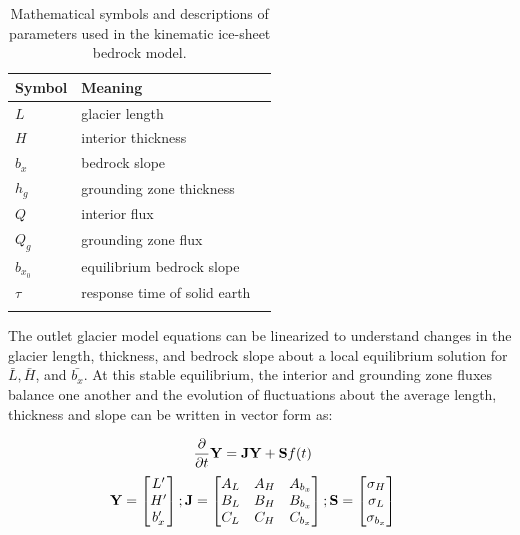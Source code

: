 \documentclass[tc, manuscript]{copernicus}
\begin{document}
\begin{table}[h]
    \begin{tabular}{lll}
        Symbol & Meaning \\
        \hline
        $L$ & glacier length \\
        $H$ & interior thickness \\
        $b_x$ & bedrock slope \\
        $h_g$ & grounding zone thickness \\
        $Q$ & interior flux \\
        $Q_g$ & grounding zone flux \\
        $b_{x_0}$ & equilibrium bedrock slope \\
        $\tau$ & response time of solid earth  \\
        \\
        
    \end{tabular}
    
    \caption{Mathematical symbols and descriptions of parameters used in the kinematic ice-sheet bedrock model.}
\end{table}

The outlet glacier model equations   can be linearized to understand changes in the glacier length, thickness, and bedrock slope about a local equilibrium solution for $\bar{L}, \bar{H}$, and $\bar{b_x}$. At this stable equilibrium, the interior and grounding zone fluxes balance one another and the evolution of fluctuations about the average length, thickness and slope can be written in vector form as:

\begin{align}
\frac{\partial}{\partial t}
\bold{Y}
 &=
\bold{J}
  \bold{Y}
    +
    \bold{S} f(t)&
\end{align}
\begin{align}
\bf{Y} = 
 \begin{bmatrix} L' \\ H' \\ b_x' \end{bmatrix};
 \bf{J}=
  \begin{bmatrix}
   A_L & A_H & A_{b_x}  \\
   B_L & B_H& B_{b_x} \\
   C_L & C_H & C_{b_x}
   \end{bmatrix};
  \bf{S}=
    \begin{bmatrix} \sigma_H \\  \sigma_L \\ \sigma_{b_x} \end{bmatrix}&
\end{align}
\end{document}
